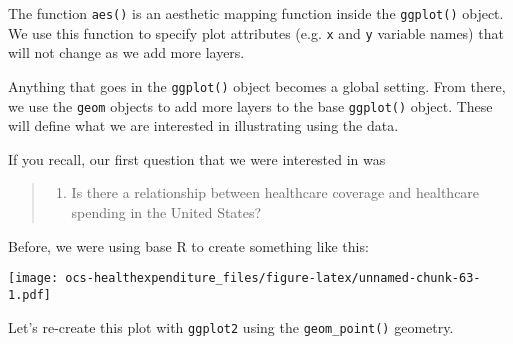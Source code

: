 \documentclass[]{article}
\newenvironment{Shaded}{\begin{snugshade}}{\end{snugshade}}
\newcommand{\DataTypeTok}[1]{\textcolor[rgb]{0.13,0.29,0.53}{#1}}
\newcommand{\FloatTok}[1]{\textcolor[rgb]{0.00,0.00,0.81}{#1}}
\newcommand{\KeywordTok}[1]{\textcolor[rgb]{0.13,0.29,0.53}{\textbf{#1}}}
\newcommand{\NormalTok}[1]{#1}
\newcommand{\OperatorTok}[1]{\textcolor[rgb]{0.81,0.36,0.00}{\textbf{#1}}}
\newcommand{\StringTok}[1]{\textcolor[rgb]{0.31,0.60,0.02}{#1}}
\providecommand{\tightlist}{%
  \setlength{\itemsep}{0pt}\setlength{\parskip}{0pt}}
\begin{document}
The function \texttt{aes()} is an aesthetic mapping function inside the
\texttt{ggplot()} object. We use this function to specify plot
attributes (e.g. \texttt{x} and \texttt{y} variable names) that will not
change as we add more layers.

Anything that goes in the \texttt{ggplot()} object becomes a global
setting. From there, we use the \texttt{geom} objects to add more layers
to the base \texttt{ggplot()} object. These will define what we are
interested in illustrating using the data.

If you recall, our first question that we were interested in was

\begin{quote}
\begin{enumerate}
\def\labelenumi{\arabic{enumi}.}
\tightlist
\item
  Is there a relationship between healthcare coverage and healthcare
  spending in the United States?
\end{enumerate}
\end{quote}

Before, we were using base R to create something like this:

\begin{Shaded}
\end{Shaded}

\texttt{[image: ocs-healthexpenditure\_files/figure-latex/unnamed-chunk-63-1.pdf]}

Let's re-create this plot with \texttt{ggplot2} using the
\texttt{geom\_point()} geometry.
\end{document}
